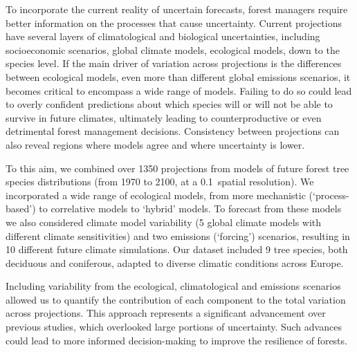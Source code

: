 \documentclass[11pt,letter]{article}
\begin{document}
To incorporate the current reality of uncertain forecasts, forest managers require better information on the processes that cause uncertainty. %
Current projections have several layers of climatological and biological uncertainties, including socioeconomic scenarios, global climate models, ecological models, down to the species level. If the main driver of variation across projections is the differences between ecological models, even more than different global emissions scenarios, it becomes critical to encompass a wide range of models. Failing to do so could lead to overly confident predictions about which species will or will not be able to survive in future climates, ultimately leading to counterproductive or even detrimental forest management decisions.
Consistency between projections can also reveal regions where models agree and where uncertainty is lower.


To this aim, we combined over 1350 projections from models of future forest tree species distributions (from 1970 to 2100, at a 0.1\degree~spatial resolution). We incorporated a wide range of ecological models, from more mechanistic (‘process-based’) to correlative models to `hybrid' models. To forecast from these models we also considered climate model variability (5 global climate models with different climate sensitivities) and two emissions (`forcing') scenarios, resulting in 10 different future climate simulations. Our dataset included 9 tree species, both deciduous and coniferous, adapted to diverse climatic conditions across Europe.

Including variability from the ecological, climatological and emissions scenarios allowed us to quantify the contribution of each component to the total variation across projections. This approach represents a significant advancement over previous studies, which overlooked large portions of uncertainty. Such advances could lead to more informed decision-making to improve the resilience of forests. 
\end{document}
